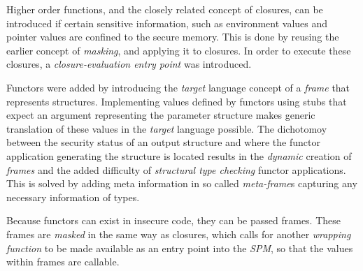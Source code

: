 Higher order functions, and the closely related concept of closures, can be introduced if certain sensitive information, such as environment values and pointer values are confined to the secure memory.
This is done by reusing the earlier concept of \emph{masking}\cite{Patrignani}, and applying it to closures.
In order to execute these closures, a \emph{closure-evaluation entry point} was introduced.

Functors were added by introducing the \emph{target} language concept of a \emph{frame} that represents structures.
Implementing values defined by functors using stubs that expect an argument representing the parameter structure makes generic translation of these values in the \emph{target} language possible.
The dichotomoy between the security status of an output structure and where the functor application generating the structure is located results in the \emph{dynamic} creation of \emph{frames} and the added difficulty of \emph{structural type checking} functor applications.
This is solved by adding meta information in so called \emph{meta-frame}s capturing any necessary information of types.

Because functors can exist in insecure code, they can be passed frames. These frames are \emph{masked} in the same way as closures, which calls for another \emph{wrapping function} to be made available as an entry point into the \emph{SPM}, so that the values within frames are callable.